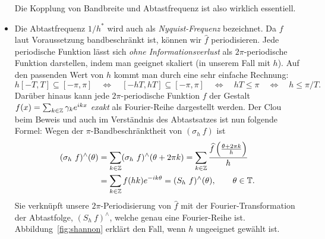 \begin{remark}
\begin{itemize}
\begin{figure}[ht]
  \end{figure}
  Die Kopplung von Bandbreite und Abtastfrequenz ist also wirklich essentiell.
\item Die Abtastfrequenz $ 1 / h^{*} $ wird auch als \emph{Nyquist-Frequenz} bezeichnet. Da $ f $ 
laut
  Voraussetzung bandbeschränkt ist, können wir $ \widehat{f} $ periodisieren. Jede periodische
  Funktion lässt sich \emph{ohne Informationsverlust} als $ 2\pi $-periodische Funktion darstellen, 
  indem man geeignet skaliert (in unserem Fall mit $ h $). Auf den passenden Wert von $ h $ kommt 
  man durch eine sehr einfache Rechnung:
  \[
    h [-T, T] \subseteq [-\pi, \pi] \quad \Leftrightarrow \quad 
    [-hT, hT] \subseteq [-\pi, \pi] \quad \Leftrightarrow \quad 
    hT \leq \pi \quad \Leftrightarrow \quad 
    h \leq \pi / T.
  \]
  Darüber hinaus kann jede $ 2\pi $-periodische Funktion $ f $ der Gestalt
  $ f(x) = \sum_{k \in \mathbb{Z}} \gamma_{k}e^{ikx} $ \emph{exakt} als Fourier-Reihe dargestellt werden. 
  Der Clou beim Beweis und auch im Verständnis des Abtastsatzes ist nun folgende Formel: Wegen
  der $ \pi $-Bandbeschränktheit von $ (\sigma_{h} \ f) $ ist
  \begin{align*}
      (\sigma_{h} \ f)^{\wedge}(\theta)
   &= \sum_{k \in \mathbb{Z}} (\sigma_{h} \ f)^{\wedge}(\theta + 2 \pi k)
    = \sum_{k \in \mathbb{Z}} \frac{\widehat{f} \left( \frac{\theta + 2\pi k}{h} \right)}{h} \\
   &= \sum_{k \in \mathbb{Z}} f(hk) e^{-ik\theta} 
    = (S_{h} \ f)^{\wedge}(\theta),
      \qquad \theta \in \mathbb{T}.
  \end{align*}
  Sie verknüpft unsere $ 2\pi $-Periodisierung von $ \widehat{f} $ mit der Fourier-Transformation 
  der Abtastfolge, $ (S_{h} \ f)^{\wedge} $, welche genau eine Fourier-Reihe ist. 
  Abbildung~\ref{fig:shannon} erklärt den Fall, wenn $ h $ ungeeignet gewählt ist.
  \begin{figure}[ht]
  \centering
  \begin{minipage}{0.49\linewidth}
\end{minipage}
\end{figure}
\end{itemize}
\end{remark}
